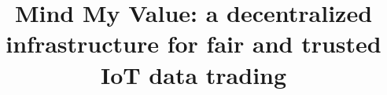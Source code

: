 \documentclass[chi_draft]{sigchi}
\begin{document}
%
\title{Mind My Value: a decentralized infrastructure for fair and trusted IoT data trading}



\emptyauthor


\maketitle
\end{document}
